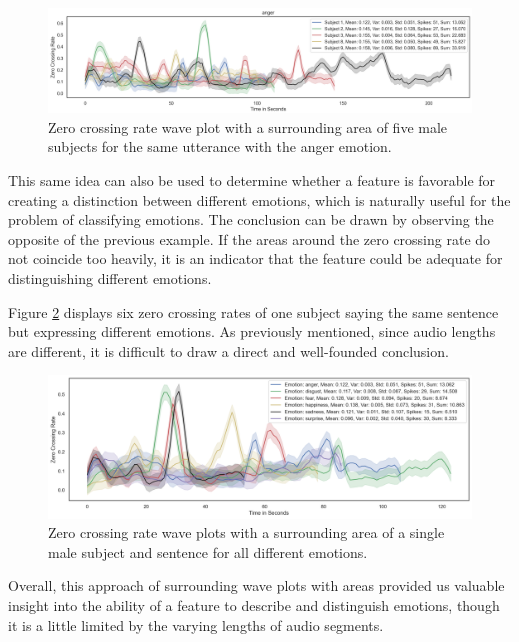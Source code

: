\begin{figure}[H]
	\centering
	\includegraphics[width=1\linewidth]{figs/4_1_traditional/zcrAreaOnly1.png}
	\caption{Zero crossing rate wave plot with a surrounding area of five male subjects for the same utterance with the anger emotion.}
	\label{fig:zcrAreaOnly1}
\end{figure}

This same idea can also be used to determine whether a feature is favorable for creating a distinction between different emotions, which is naturally useful for the problem of classifying emotions. The conclusion can be drawn by observing the opposite of the previous example. If the areas around the zero crossing rate do not coincide too heavily, it is an indicator that the feature could be adequate for distinguishing different emotions.

Figure \ref{fig:zcrAreaSameSubj} displays six zero crossing rates of one subject saying the same sentence but expressing different emotions. As previously mentioned, since audio lengths are different, it is difficult to draw a direct and well-founded conclusion.

\begin{figure}[H]
	\centering
	\includegraphics[width=.8\linewidth]{figs/4_1_traditional/zcr_male_same_subject.png}
	\caption{Zero crossing rate wave plots with a surrounding area of a single male subject and sentence for all different emotions.}
	\label{fig:zcrAreaSameSubj}
\end{figure}

Overall, this approach of surrounding wave plots with areas provided us valuable insight into the ability of a feature to describe and distinguish emotions, though it is a little limited by the varying lengths of audio segments.

